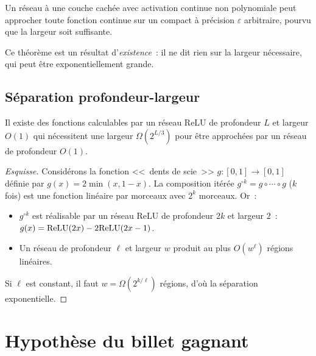 \begin{theoreme}
\label{thm:universal-approx}
Un r\'eseau \`a une couche cach\'ee avec activation continue non polynomiale
peut approcher toute fonction continue sur un compact \`a pr\'ecision
$\varepsilon$ arbitraire, pourvu que la largeur soit suffisante.
\end{theoreme}

\begin{attention}
Ce th\'eor\`eme est un r\'esultat d'\emph{existence}~: il ne dit rien sur
la largeur n\'ecessaire, qui peut \^etre exponentiellement grande.
\end{attention}

\subsection{S\'eparation profondeur-largeur}

\begin{theoreme}[Telgarsky, 2016]
\label{thm:depth-separation}
Il existe des fonctions calculables par un r\'eseau ReLU de profondeur $L$
et largeur $O(1)$ qui n\'ecessitent une largeur $\Omega(2^{L/3})$ pour \^etre
approch\'ees par un r\'eseau de profondeur $O(1)$.
\end{theoreme}

\begin{proof}[Esquisse]
Consid\'erons la fonction <<~dents de scie~>> $g : [0,1] \to [0,1]$
d\'efinie par $g(x) = 2\min(x, 1-x)$. La composition it\'er\'ee
$g^{\circ k} = g \circ \cdots \circ g$ ($k$ fois) est une fonction
lin\'eaire par morceaux avec $2^k$ morceaux. Or~:
\begin{itemize}
    \item $g^{\circ k}$ est r\'ealisable par un r\'eseau ReLU de profondeur $2k$
          et largeur $2$~: $g(x) = \mathrm{ReLU}(2x) - 2\mathrm{ReLU}(2x - 1)$.
    \item Un r\'eseau de profondeur $\ell$ et largeur $w$ produit au plus
          $O(w^\ell)$ r\'egions lin\'eaires.
\end{itemize}
Si $\ell$ est constant, il faut $w = \Omega(2^{k/\ell})$ r\'egions,
d'o\`u la s\'eparation exponentielle.
\end{proof}

\section{Hypoth\`ese du billet gagnant}
\label{sec:lottery-ticket}

